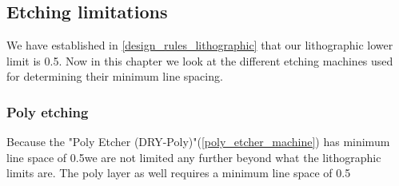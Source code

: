 \subsection{Etching limitations}
We have established in \autoref{design_rules_lithographic} that our lithographic lower limit is 0.5\um.
Now in this chapter we look at the different etching machines used for determining their minimum line spacing.

\subsubsection{Poly etching}
Because the "Poly Etcher (DRY-Poly)"(\autoref{poly_etcher_machine}) has minimum line space of 0.5\um we are not limited any further beyond what the lithographic limits are.
The poly layer as well requires a minimum line space of 0.5\um